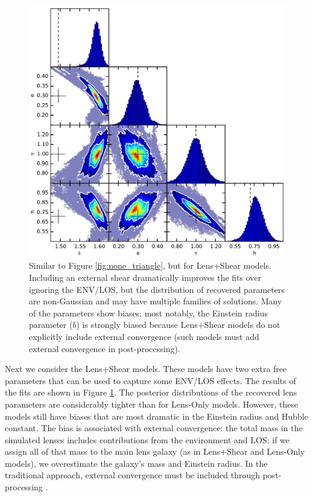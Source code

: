 \documentclass{emulateapj}
\begin{document}
\begin{figure}[ht]
\begin{center}
\includegraphics[width=1\textwidth]{all_shear_1e-2.pdf}
\caption{\label{fig:shear_triangle} Similar to Figure \ref{fig:none_triangle}, but for Lens+Shear models. Including an external shear dramatically improves the fits over ignoring the ENV/LOS, but the distribution of recovered parameters are non-Gaussian and may have multiple families of solutions. Many of the parameters show biases; most notably, the Einstein radius parameter ($b$) is strongly biased because Lens+Shear models do not explicitly include external convergence (such models must add external convergence in post-processing).  
}
\end{center}
\end{figure}

Next we consider the Lens+Shear models. These models have two extra free parameters that can be used to capture some ENV/LOS effects. The results of the fits are shown in Figure \ref{fig:shear_triangle}. The posterior distributions of the recovered lens parameters are considerably tighter than for Lens-Only models. However, these models still have biases that are most dramatic in the Einstein radius and Hubble constant. The bias is associated with external convergence: the total mass in the simulated lenses includes contributions from the environment and LOS; if we assign all of that mass to the main lens galaxy (as in Lens+Shear and Lens-Only models), we overestimate the galaxy's mass and Einstein radius.  In the traditional approach, external convergence must be included through post-processing \citep{Collett13, Suyu10}. 
\end{document}
